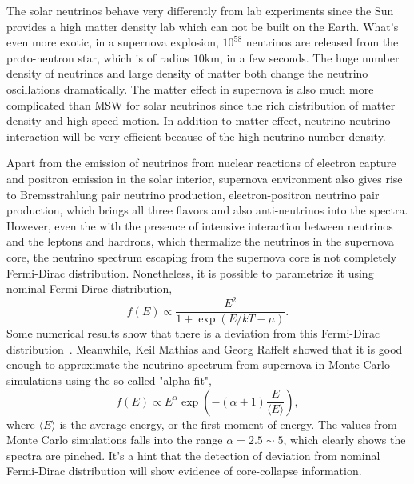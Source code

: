 The solar neutrinos behave very differently from lab experiments since the Sun provides a high matter density lab which can not be built on the Earth. What's even more exotic, in a supernova explosion, $10^{58}$ neutrinos are released from the proto-neutron star, which is of radius $10\mathrm{km}$, in a few seconds. The huge number density of neutrinos and large density of matter both change the neutrino oscillations dramatically. The matter effect in supernova is also much more complicated than MSW for solar neutrinos since the rich distribution of matter density and high speed motion. In addition to matter effect, neutrino neutrino interaction will be very efficient because of the high neutrino number density.

Apart from the emission of neutrinos from nuclear reactions of electron capture and positron emission in the solar interior, supernova environment also gives rise to Bremsstrahlung pair neutrino production, electron-positron neutrino pair production, which brings all three flavors and also anti-neutrinos into the spectra. However, even the with the presence of intensive interaction between neutrinos and the leptons and hardrons, which thermalize the neutrinos in the supernova core, the neutrino spectrum escaping from the supernova core is not completely Fermi-Dirac distribution. Nonetheless, it is possible to parametrize it using nominal Fermi-Dirac distribution,\cite{ysuzuki2004}
\begin{equation}
f(E)\propto \frac{E^2}{1+\exp ( E/kT - \mu )}.
\end{equation}
Some numerical results show that there is a deviation from this Fermi-Dirac distribution~\cite{Totani1998,Keil2003}. Meanwhile, Keil Mathias and Georg Raffelt showed that it is good enough to approximate the neutrino spectrum from supernova in Monte Carlo simulations using the so called "alpha fit",
\begin{equation}
f(E)\propto E^\alpha \exp\left( -(\alpha+1)\frac{E}{\langle E\rangle} \right),
\end{equation}
where $\langle E\rangle$ is the average energy, or the first moment of energy. The values from Monte Carlo simulations falls into the range $\alpha = 2.5\sim 5$,
which clearly shows the spectra are pinched. It's a hint that the detection of deviation from nominal Fermi-Dirac distribution will show evidence of core-collapse information.




